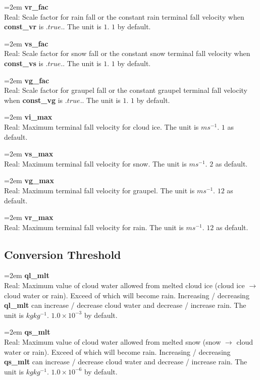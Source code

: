\documentclass[letterpaper,titlepage,10pt]{article}
\numberwithin{equation}{section}
\begin{document}
\begin{appendices}
\hangindent=2em
\textbf{vr\_fac}\\ Real: Scale factor for rain fall or the constant rain terminal fall velocity when \textbf{const\_vr} is $.true.$. The unit is $1$. $1$ by default.

\hangindent=2em
\textbf{vs\_fac}\\ Real: Scale factor for snow fall or the constant snow terminal fall velocity when \textbf{const\_vs} is $.true.$. The unit is $1$. $1$ by default.

\hangindent=2em
\textbf{vg\_fac}\\ Real: Scale factor for graupel fall or the constant graupel terminal fall velocity when \textbf{const\_vg} is $.true.$. The unit is $1$. $1$ by default.

\hangindent=2em
\textbf{vi\_max}\\ Real: Maximum terminal fall velocity for cloud ice. The unit is $m s^{-1}$. $1$ as default.

\hangindent=2em
\textbf{vs\_max}\\ Real: Maximum terminal fall velocity for snow. The unit is $m s^{-1}$. $2$ as default.

\hangindent=2em
\textbf{vg\_max}\\ Real: Maximum terminal fall velocity for graupel. The unit is $m s^{-1}$. $12$ as default.

\hangindent=2em
\textbf{vr\_max}\\ Real: Maximum terminal fall velocity for rain. The unit is $m s^{-1}$. $12$ as default.


\subsection{Conversion Threshold}

\hangindent=2em
\textbf{ql\_mlt}\\ Real: Maximum value of cloud water allowed from melted cloud ice (cloud ice $\rightarrow$ cloud water or rain). Exceed of which will become rain. Increasing / decreasing \textbf{ql\_mlt} can increase / decrease cloud water and decrease / increase rain. The unit is $kg kg^{-1}$. $1.0 \times 10^{-3}$ by default.

\hangindent=2em
\textbf{qs\_mlt}\\ Real: Maximum value of cloud water allowed from melted snow (snow $\rightarrow$ cloud water or rain). Exceed of which will become rain. Increasing / decreasing \textbf{qs\_mlt} can increase / decrease cloud water and decrease / increase rain. The unit is $kg kg^{-1}$. $1.0 \times 10^{-6}$ by default.


\end{appendices}
\end{document}
